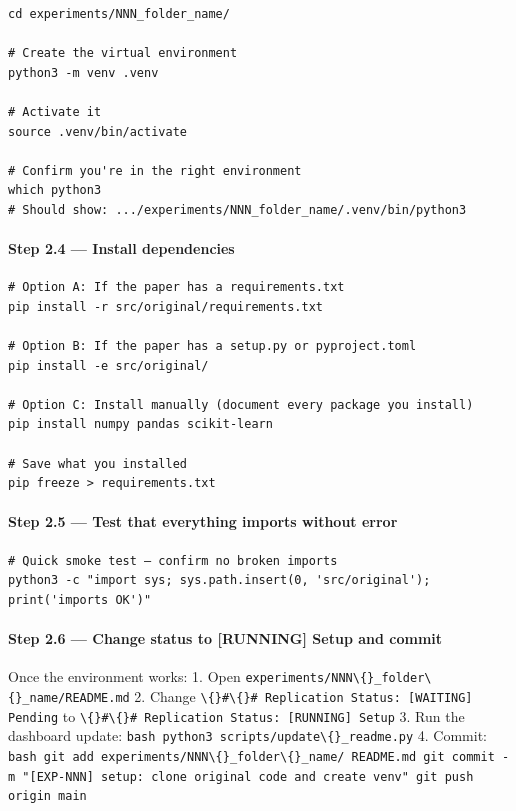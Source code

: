 \begin{verbatim}
cd experiments/NNN_folder_name/

# Create the virtual environment
python3 -m venv .venv

# Activate it
source .venv/bin/activate

# Confirm you're in the right environment
which python3
# Should show: .../experiments/NNN_folder_name/.venv/bin/python3
\end{verbatim}

\paragraph{Step 2.4 --- Install
dependencies}\label{step-2.4-install-dependencies}

\begin{verbatim}
# Option A: If the paper has a requirements.txt
pip install -r src/original/requirements.txt

# Option B: If the paper has a setup.py or pyproject.toml
pip install -e src/original/

# Option C: Install manually (document every package you install)
pip install numpy pandas scikit-learn

# Save what you installed
pip freeze > requirements.txt
\end{verbatim}

\paragraph{Step 2.5 --- Test that everything imports without
error}\label{step-2.5-test-that-everything-imports-without-error}

\begin{verbatim}
# Quick smoke test — confirm no broken imports
python3 -c "import sys; sys.path.insert(0, 'src/original'); print('imports OK')"
\end{verbatim}

\paragraph{Step 2.6 --- Change status to {[}RUNNING{]} Setup and
commit}\label{step-2.6-change-status-to-running-setup-and-commit}

Once the environment works: 1. Open
\texttt{experiments/NNN\textbackslash\{\}\_folder\textbackslash\{\}\_name/README.md} 2.
Change
\texttt{\textbackslash\{\}\#\textbackslash\{\}\# Replication Status: [WAITING] Pending} to
\texttt{\textbackslash\{\}\#\textbackslash\{\}\# Replication Status: [RUNNING] Setup} 3.
Run the dashboard update:
\texttt{bash    python3 scripts/update\textbackslash\{\}\_readme.py} 4.
Commit:
\texttt{bash    git add experiments/NNN\textbackslash\{\}\_folder\textbackslash\{\}\_name/ README.md    git commit -m "[EXP-NNN] setup: clone original code and create venv"    git push origin main}

